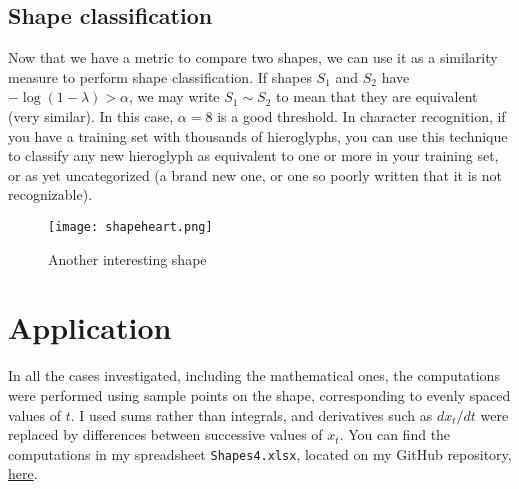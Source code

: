 \documentclass[oneside,10pt]{book}
\begin{document}
\subsection{Shape classification}

Now that we have a metric to compare two shapes, we can use it as a similarity measure to perform shape classification. If shapes $S_1$ and $S_2$ have
$-\log(1-\lambda)> \alpha$, we may write $S_1 \sim S_2$ to mean that they are equivalent (very similar). In this case, $\alpha=8$ is a good threshold. In character recognition, if you have a training set with thousands of hieroglyphs, you can use this technique to classify any new hieroglyph as equivalent to one or more in your training set, or as yet uncategorized (a brand new one, or one so poorly written that it is not recognizable).

\begin{figure}%
\centering
\texttt{[image: shapeheart.png]} %
\caption{Another interesting shape}
\label{fig:34b}
\end{figure}

\section{Application}\label{s5}

In all the cases investigated, including the mathematical ones, the computations were performed using sample points on the shape, corresponding to evenly spaced values of $t$.  I used sums rather than integrals, and derivatives such as $dx_t/dt$ were replaced by differences between successive values of $x_t$. You can find the computations in my spreadsheet \texttt{Shapes4.xlsx}, located on my GitHub repository, \href{https://github.com/VincentGranville/Machine-Learning/blob/main/Spreadsheets/README.md}{here}.
\end{document}
